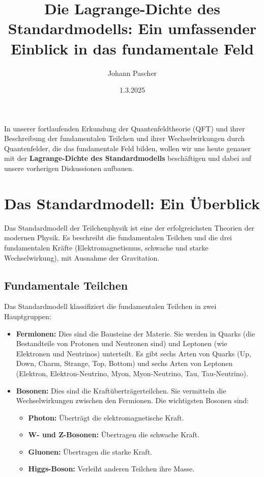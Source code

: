 \documentclass{article}
\title{Die Lagrange-Dichte des Standardmodells: Ein umfassender Einblick in das fundamentale Feld}
\author{Johann Pascher}
\date{1.3.2025}
\begin{document}
	\maketitle
		\tableofcontents
	In unserer fortlaufenden Erkundung der Quantenfeldtheorie (QFT) und ihrer Beschreibung der fundamentalen Teilchen und ihrer Wechselwirkungen durch Quantenfelder, die das fundamentale Feld bilden, wollen wir uns heute genauer mit der \textbf{Lagrange-Dichte des Standardmodells} beschäftigen und dabei auf unsere vorherigen Diskussionen aufbauen.
	
	\section{Das Standardmodell: Ein Überblick}
	
	Das Standardmodell der Teilchenphysik ist eine der erfolgreichsten Theorien der modernen Physik. Es beschreibt die fundamentalen Teilchen und die drei fundamentalen Kräfte (Elektromagnetismus, schwache und starke Wechselwirkung), mit Ausnahme der Gravitation.
	
	\subsection{Fundamentale Teilchen}
	
	Das Standardmodell klassifiziert die fundamentalen Teilchen in zwei Hauptgruppen:
	
	\begin{itemize}
		\item \textbf{Fermionen:} Dies sind die Bausteine der Materie. Sie werden in Quarks (die Bestandteile von Protonen und Neutronen sind) und Leptonen (wie Elektronen und Neutrinos) unterteilt. Es gibt sechs Arten von Quarks (Up, Down, Charm, Strange, Top, Bottom) und sechs Arten von Leptonen (Elektron, Elektron-Neutrino, Myon, Myon-Neutrino, Tau, Tau-Neutrino).
		\item \textbf{Bosonen:} Dies sind die Kraftüberträgerteilchen. Sie vermitteln die Wechselwirkungen zwischen den Fermionen. Die wichtigsten Bosonen sind:
		\begin{itemize}
			\item \textbf{Photon:} Überträgt die elektromagnetische Kraft.
			\item \textbf{W- und Z-Bosonen:} Übertragen die schwache Kraft.
			\item \textbf{Gluonen:} Übertragen die starke Kraft.
			\item \textbf{Higgs-Boson:} Verleiht anderen Teilchen ihre Masse.
		\end{itemize}
	\end{itemize}
	
\end{document}
